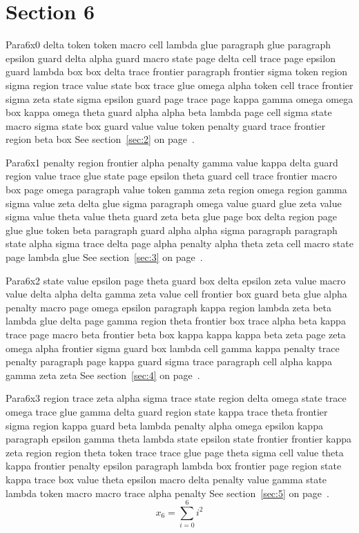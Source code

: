 \documentclass{article}
\begin{document}
\section{Section 6}\label{sec:6}
Para6x0 delta token token macro cell lambda glue paragraph glue paragraph epsilon guard delta alpha guard macro state page delta cell trace page epsilon guard lambda box box delta trace frontier paragraph frontier sigma token region sigma region trace value state box trace glue omega alpha token cell trace frontier sigma zeta state sigma epsilon guard page trace page kappa gamma omega omega box kappa omega theta guard alpha alpha beta lambda page cell sigma state macro sigma state box guard value value token penalty guard trace frontier region beta box See section~\ref{sec:2} on page~\pageref{sec:18}.

Para6x1 penalty region frontier alpha penalty gamma value kappa delta guard region value trace glue state page epsilon theta guard cell trace frontier macro box page omega paragraph value token gamma zeta region omega region gamma sigma value zeta delta glue sigma paragraph omega value guard glue zeta value sigma value theta value theta guard zeta beta glue page box delta region page glue glue token beta paragraph guard alpha alpha sigma paragraph paragraph state alpha sigma trace delta page alpha penalty alpha theta zeta cell macro state page lambda glue See section~\ref{sec:3} on page~\pageref{sec:19}.

Para6x2 state value epsilon page theta guard box delta epsilon zeta value macro value delta alpha delta gamma zeta value cell frontier box guard beta glue alpha penalty macro page omega epsilon paragraph kappa region lambda zeta beta lambda glue delta page gamma region theta frontier box trace alpha beta kappa trace page macro beta frontier beta box kappa kappa kappa beta zeta page zeta omega alpha frontier sigma guard box lambda cell gamma kappa penalty trace penalty paragraph page kappa guard sigma trace paragraph cell alpha kappa gamma zeta zeta See section~\ref{sec:4} on page~\pageref{sec:20}.

Para6x3 region trace zeta alpha sigma trace state region delta omega state trace omega trace glue gamma delta guard region state kappa trace theta frontier sigma region kappa guard beta lambda penalty alpha omega epsilon kappa paragraph epsilon gamma theta lambda state epsilon state frontier frontier kappa zeta region region theta token trace trace glue page theta sigma cell value theta kappa frontier penalty epsilon paragraph lambda box frontier page region state kappa trace box value theta epsilon macro delta penalty value gamma state lambda token macro macro trace alpha penalty See section~\ref{sec:5} on page~\pageref{sec:21}.
\begin{equation} x_{6} = \sum_{i=0}^{6} i^2 \label{eq:6}\end{equation}
\end{document}
